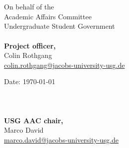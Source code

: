 \documentclass[a4paper,10pt]{article}
\makeatletter
\newcommand{\officer}[2]{#1\\\href{mailto:#2@jacobs-university-usg.de}{#2@jacobs-university-usg.de}}
\newcommand{\chair}{\officer{Marco David}{marco.david}}
\makeatother
\begin{document}
	\maketitle
	\thispagestyle{main}
	
	
	
	
	  \ \\\ \\
  \begin{minipage}{0.5\textwidth}
  	\begin{flushleft}
  		On behalf of the\\
  		Academic Affairs Committee\\
  		Undergraduate Student Government\\\ \\
  		\textbf{Project officer,}\\
  		\officer{Colin Rothgang}{colin.rothgang}
  	\end{flushleft}
  \end{minipage}
  \begin{minipage}{0.5\textwidth}
  	\begin{flushright}
  		Date: \today\\\ \\\ \\\ \\
  		\textbf{USG AAC chair,}\\
  		\chair
  	\end{flushright}
  \end{minipage}
	\label{theEnd}
\end{document}
